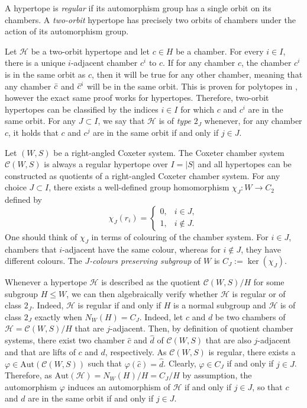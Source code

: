 \documentclass[11pt,letterpaper]{amsart}
\newcommand{\Aut}{\mathrm{Aut}}
\newcommand{\C}{\mathcal{C}}
\begin{document}
A hypertope is \emph{regular} if its automorphism group has a single orbit on its chambers. A \emph{two-orbit} hypertope has precisely two orbits of chambers under the action of its automorphism group. 

Let $\mathcal{H}$ be a two-orbit hypertope and let $c \in H$  be a chamber. For every $i \in I$, there is a unique $i$-adjacent chamber $c^i$ to $c$. If for any chamber $c$, the chamber $c^i$ is in the same orbit as $c$, then it will be true for any other chamber, meaning that any chamber $\Bar{c}$ and $\Bar{c}^i$ will be in the same orbit. This is proven for polytopes in \cite[Proposition 2.219]{Pellicer_2025}, however the exact same proof works for hypertopes. Therefore, two-orbit hypertopes can be classified by the indices $i \in I$ for which $c$ and $c^i$ are in the same orbit. For any $J \subset I$, we say that $\mathcal{H}$ is of \emph{type} $2_J$ whenever, for any chamber $c$, it holds that $c$ and $c^j$ are in the same orbit if and only if $j \in J$.

Let $(W,S)$ be a right-angled Coxeter system. The Coxeter chamber system $\C(W,S)$ is always a regular hypertope over $I = |S|$ and all hypertopes can be constructed as quotients of a right-angled Coxeter chamber system. For any choice $J \subset I$, there exists a well-defined group homomorphism $\chi_J \colon W \to C_2$ defined by
$$
\chi_J(r_i) = \begin{cases}0,&i\in J,\\1,&i\notin J.\end{cases}
$$
One should think of $\chi_J$ in terms of colouring of the chamber system. For $i \in J$, chambers that $i$-adjacent have the same colour, whereas for $i \notin J$, they have different colours. The \emph{$J$-colours preserving subgroup} of $W$ is $C_J := \ker(\chi_J)$. 


 Whenever a hypertope $\mathcal{H}$ is described as the quotient $\C(W,S)/H$ for some subgroup $H \leq W$, we can then algebraically verify whether $\mathcal{H}$ is regular or of class $2_J$. Indeed, $\mathcal{H}$ is regular if and only if $H$ is a normal subgroup and $\mathcal{H}$ is of class $2_J$ exactly when $N_W(H) = C_J$. Indeed, let $c$ and $d$ be two chambers of $\mathcal{H}=\C(W,S)/H$ that are $j$-adjacent. Then, by definition of quotient chamber systems, there exist two chamber $\hat{c}$ and $\hat{d}$ of $\C(W,S)$ that are also $j$-adjacent and that are lifts of $c$ and $d$, respectively. As $\C(W,S)$ is regular, there exists a $\varphi \in \Aut(\C(W,S))$ such that $\varphi(\hat{c}) = \hat{d}$. Clearly, $\varphi \in C_J$ if and only if $j \in J$. Therefore, as $\Aut(\mathcal{H}) = N_W(H)/H = C_J/H$ by assumption, the automorphism $\varphi$ induces an automorphism of $\mathcal{H}$ if and only if $j \in J$, so that $c$ and $d$ are in the same orbit if and only if $j \in J$.
\end{document}

